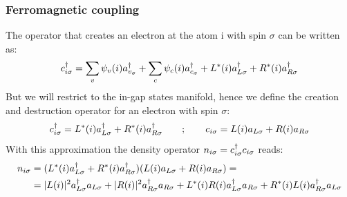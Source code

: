 \subsubsection{Ferromagnetic coupling}
The operator that creates an electron at the atom i with spin $\sigma$ can be written as:
\begin{equation}
  c^{\dagger}_{i\sigma} = \sum_v\psi_v(i)a^{\dagger}_{v_\sigma}+
                      \sum_c\psi_c(i)a^{\dagger}_{c_\sigma}+
                      L^*(i)a^{\dagger}_{L\sigma} + R^*(i)a^{\dagger}_{R\sigma}
\label{creation}
\end{equation}
But we will restrict to the in-gap states manifold, hence we define the creation and destruction operator for an electron with spin $\sigma$:
\begin{equation}
  c^{\dagger}_{i\sigma} = L^*(i)a^{\dagger}_{L\sigma} + R^*(i)a^{\dagger}_{R\sigma}
  \quad\quad;\quad\quad
  c_{i\sigma} = L(i)a_{L\sigma} + R(i)a_{R\sigma}
\end{equation}
With this approximation the density operator $n_{i\sigma} = c^{\dagger}_{i\sigma}c_{i\sigma}$  reads:
\begin{equation}
  \begin{split}
  n_{i\sigma} &= (L^*(i)a^{\dagger}_{L\sigma} + R^*(i)a^{\dagger}_{R\sigma})
                 (L(i)a_{L\sigma} + R(i)a_{R\sigma}) =\\
              &= |L(i)|^2 a^{\dagger}_{L\sigma}a_{L\sigma}+
                 |R(i)|^2 a^{\dagger}_{R\sigma}a_{R\sigma}+
                 L^*(i)R(i)a^{\dagger}_{L\sigma}a_{R\sigma}+
                 R^*(i)L(i)a^{\dagger}_{R\sigma}a_{L\sigma}
  \end{split}
\end{equation}

